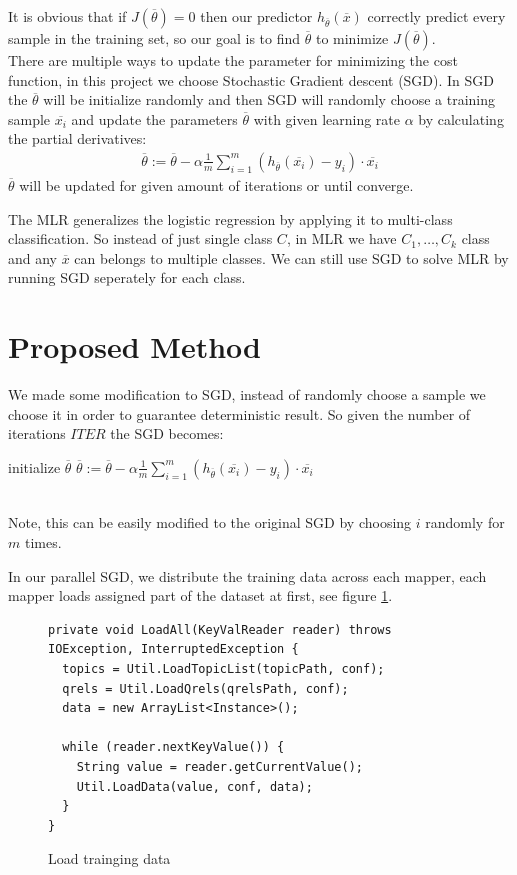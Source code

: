 \documentclass{sig-alternate-05-2015}
\begin{document}
It is obvious that if $J(\overline{\theta}) = 0$ then our predictor $h_{\overline{\theta}}(\overline{x})$ correctly predict every sample in the training set,
so our goal is to find $\overline{\theta}$ to minimize $J(\overline{\theta})$.\\
There are multiple ways to update the parameter for minimizing the cost function,
in this project we choose Stochastic Gradient descent (SGD).
In SGD the $\overline{\theta}$ will be initialize randomly and then SGD will randomly choose a training sample $\overline{x_i}$ and update the parameters $\overline{\theta}$ with given learning rate $\alpha$ by calculating the partial derivatives:
\begin {align} \label{eq:3}
\overline{\theta} := \overline{\theta} - \alpha \frac{1}{m} \sum_{i=1}^m (h_{\overline{\theta}} (\overline{x_i}) - y_i) \cdot \overline{x_i}
\end{align}
$\overline{\theta}$ will be updated for given amount of iterations or until converge.\par
The MLR generalizes the logistic regression by applying it to multi-class classification.
So instead of just single class $C$, in MLR we have $C_1, \ldots, C_k$ class and any $\overline{x}$
can belongs to multiple classes.
We can still use SGD to solve MLR by running SGD seperately for each class.
\section{Proposed Method}\label{sec:method}
We made some modification to SGD, instead of randomly choose a sample we choose it in order to guarantee deterministic result.
So given the number of iterations $ITER$ the SGD becomes:
\begin{algorithm}
  \begin{algorithmic}[1]
    \State initialize $\overline{\theta}$
    \State $\overline{\theta} := \overline{\theta} - \alpha \frac{1}{m} \sum_{i=1}^m (h_{\overline{\theta}} (\overline{x_i}) - y_i) \cdot \overline{x_i}$
    \EndFor
    \EndFor
  \end{algorithmic}
\end{algorithm}\\
Note, this can be easily modified to the original SGD by choosing $i$ randomly for $m$ times.\par
In our parallel SGD, we distribute the training data across each mapper,
each mapper loads assigned part of the dataset at first, see figure \ref{fig:load}.
\begin{figure}[h]
\begin{lstlisting}
private void LoadAll(KeyValReader reader) throws IOException, InterruptedException {
  topics = Util.LoadTopicList(topicPath, conf);
  qrels = Util.LoadQrels(qrelsPath, conf);
  data = new ArrayList<Instance>();

  while (reader.nextKeyValue()) {
    String value = reader.getCurrentValue();
    Util.LoadData(value, conf, data);
  }
}
\end{lstlisting}
\caption{Load trainging data}
\label{fig:load}
\end{figure}
\end{document}
